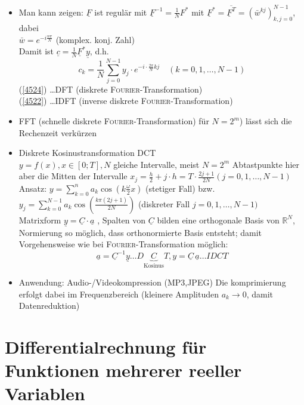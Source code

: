 \documentclass[a4paper]{scrartcl}
\begin{document}
\begin{itemize}
\item Man kann zeigen: $\underline{F}$ ist regulär mit $\underline{F}^{-1} = \frac{1}{N} F^*$ mit $\underline{F}^* = \overline{\underline{F}^T} = \left ( \bar{w}^{kj} \right )_{k,j=0}^{N-1}$, dabei\\
$\bar{w} = e^{-i \frac{n\pi}{N}}$ (komplex. konj. Zahl)\\
Damit ist $\underline{c} = \frac{1}{N} \underline{F}^* \underline{y}$, d.h.
\begin{equation}\label{4524}
c_k = \frac{1}{N} \sum\limits_{j=0}^{N-1} y_j \cdot e^{-i \cdot \frac{2\pi}{N} kj} \quad (k=0,1,\dots,N-1)
\end{equation}
(\ref{4524}) \dots DFT (diskrete \textsc{Fourier}-Transformation)\\
(\ref{4522}) \dots IDFT (inverse diskrete \textsc{Fourier}-Transformation)

\item FFT (schnelle diskrete \textsc{Fourier}-Transformation) für $N=2^m$) lässt sich die Rechenzeit verkürzen
\item Diskrete Kosinustransformation DCT\\
$y= f(x), x \in [0;T], N$ gleiche Intervalle, meist $N=2^m$ Abtastpunkte hier aber die Mitten der Intervalle $x_j = \frac{h}{2} + j \cdot h = T \cdot \frac{2j+1}{2N} (j=0,1,\dots,N-1)$\\
Ansatz: $y= \sum\limits_{k=0}^n a_k \cos{(k \frac{\omega}{2} x)}$ (stetiger Fall) bzw.\\
$y_j = \sum\limits_{k=0}^{N-1} a_k \cos{(\frac{k \pi (2j +1)}{2N})}$ (diskreter Fall $j=0,1,\dots,N-1)$\\
Matrixform $\underline{y} = \underline{C} \cdot \underline{a} $ , Spalten von $\underline{C}$ bilden eine orthogonale Basis von $\mathbb{R}^N$, Normierung so möglich, dass orthonormierte Basis entsteht; damit Vorgehensweise wie bei \textsc{Fourier}-Transformation möglich:
\[ \underline{a} = \underline{C}^{-1} \underline{y} \dots D\underbrace{C}_{\text{Kosinus}}T, y= \underline{C} \, \underline{a} \dots IDCT \]

\item  Anwendung: Audio-/Videokompression (MP3,JPEG) Die komprimierung erfolgt dabei im Frequenzbereich (kleinere Amplituden $a_k \longrightarrow 0$, damit Datenreduktion)

\end{itemize}

\section{Differentialrechnung für Funktionen mehrerer reeller Variablen}
\end{document}
